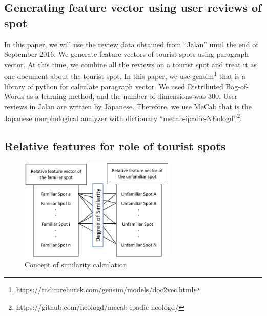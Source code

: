 \documentclass[journal]{IAENGtran}
\begin{document}
\subsection{Generating feature vector using user reviews of spot}
\label{subsec:Generating feature vector using user reviews of spot}
In this paper, we will use the review data obtained from ``Jalan'' until the end of September 2016.
We generate feature vectors of tourist spots using paragraph vector\cite{Codd10}.
At this time, we combine all the reviews on a tourist spot and treat it as one document about the tourist spot.
In this paper, we use gensim\footnote{https://radimrehurek.com/gensim/models/doc2vec.html} that is a library of python for calculate paragraph vector.
We used Distributed Bag-of-Words as a learning method, and the number of dimensions was 300.
User reviews in Jalan are written by Japanese.
Therefore, we use MeCab\cite{Codd11} that is the Japanese morphological analyzer with dictionary ``mecab-ipadic-NEologd''\footnote{https://github.com/neologd/mecab-ipadic-neologd/}.

\subsection{Relative features for role of tourist spots}
\label{subsec:Relative features of tourist spots}

\begin{figure}[t]
  \begin{center}
    \includegraphics[clip,width=7.5cm,bb=0 0 702 458]{picture/Photo_CosSim_eng.png}
    \caption{Concept of similarity calculation}
    \label{fig:Photo_CosSim}
  \end{center}
\end{figure}
\end{document}
